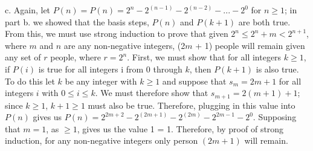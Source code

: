 \documentclass{article}
\begin{document}
\clearpage
\header
\item[]c. Again, let $P(n) = P(n) = 2^{n} - 2^{(n-1)} - 2^{(n-2)}- ... - 2^{0}$ for $n \geq 1$; in part b. we showed that the basis steps, $P(n)$ and $P(k + 1)$ are both true. From this, we must use strong induction to prove that given $2^{n} \leq 2^{n} + m < 2^{n+1}$, where $m$ and $n$ are any non-negative integers, (2$m$ + 1) people will remain given any set of $r$ people, where $r = 2^{n}$. First, we must show that for all integers $k \geq 1$, if $P(i)$ is true for all integers i from 0 through $k$, then $P(k + 1)$ is also true. To do this let $k$ be any integer with $k \geq 1$ and suppose that $s_m = 2m + 1$ for all integers $i$ with $0\leq i\leq k$. We must therefore show that $s_{m+1} = 2(m+1) + 1$; since $k \geq 1$, $k+1 \geq 1$ must also be true. Therefore, plugging in this value into $P(n)$ gives us $P(n) = 2^{2m + 2} - 2^{(2m+1)} - 2^{(2m)}- 2^{2m-1} - 2^{0}$. Supposing that $m = 1$, as $ \geq 1$, gives us the value 1 = 1. Therefore, by proof of strong induction, for any non-negative integers only person $(2m+1)$ will remain.
\end{document}
